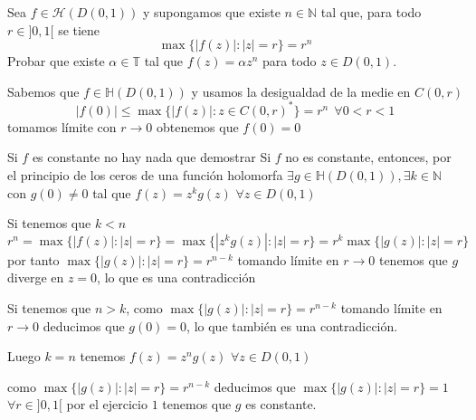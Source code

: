 \begin{ejer}
	Sea $f\in\mathcal{H}(D(0,1))$ y supongamos que existe $n\in\mathbb{N}$ tal que, para todo $r\in ]0,1[$ se tiene
	$$ \max \{ |f(z)| : |z|=r \} = r^n $$
	Probar que existe $\alpha\in\mathbb{T}$ tal que $f(z)=\alpha z^n$ para todo $z\in D(0,1)$.
\end{ejer}
\begin{sol}
Sabemos que $f\in\mathbb{H}(D(0,1))$ y usamos la desigualdad de la medie en $C(0,r)$ 
$$|f(0)| \leq \max\{ |f(z)| : z\in C(0,r)^{\ast} \} = r^n\ \ \forall 0<r<1$$
tomamos límite con $r\rightarrow 0$ obtenemos que $f(0)=0$

Si $f$ es constante no hay nada que demostrar
Si $f$ no es constante, entonces, por el principio de los ceros de una función holomorfa $\exists g\in\mathbb{H}(D(0,1)), \exists k\in\mathbb{N}$ con $g(0) \not=0$ tal que $f(z) = z^kg(z)$ $\forall z\in D(0,1)$

Si tenemos que $k<n$
$$r^n = \max\{ |f(z)| : |z|=r \} = \max\{ |z^kg(z)| : |z|=r \} = r^k \max\{ |g(z)| : |z|=r \}$$
por tanto
$\max\{ |g(z)| : |z|=r \} = r^{n-k}$ tomando límite en $r\rightarrow0$ tenemos que $g$ diverge en $z=0$, lo que es una contradicción

Si tenemos que $n>k$,
como $\max\{ |g(z)| : |z|=r \} = r^{n-k}$ tomando límite en $r\rightarrow 0$ deducimos que $g(0)=0$, lo que también es una contradicción.

Luego $k=n$ tenemos $f(z)=z^ng(z)$ $\forall z\in D(0,1)$

como $\max\{ |g(z)| : |z|=r \} = r^{n-k}$ deducimos que $\max\{ |g(z)| : |z|=r \} = 1$ $\forall r\in]0,1[$
por el ejercicio $1$ tenemos que $g$ es constante.



\begin{comment}
	ENUNCIADO
	Si $f\in\mathbb{H}(\mathbb{C})$ y es inyectiva, ¿Qué se puede decir de $f$?
	
	SOLUCIÓN
	Como $f$ es entera tenemos que $f(z) = \sum_{n=0}^{\infty} \frac{f^{(n)}(0)}{n!}z^n \forall z\in\mathbb{C}$
	
	Si $f$ es un polinomio de grado $k$
	si $k\geq 2$ el teorema fundamental del álgebra nos dice que $f$ tiene al menos $2$ ceros (contando multiplicidad), los ceros no pueden ser distintos porque $f$ es inyectiva, por tanto $f$ tiene un cero de orden al menos $2$.
	
	$f$ no es inyectiva en un entorno de un punto donde se anule la derivada, por tanto tenemos una contradicción ya que $f$ es inyectiva.
	
	Si $f$ es entera no polinómica, como consecuencia del teorema de Casorati $f(\mathbb{C}\backslash\overline{D}(0,R))$ es denso en $\mathbb{C}$
	
	Por el teorema de la aplicación abierta sabemos que $f(D(0,r))$
	Entonces hay dos puntos donde la función vale lo mismo, por tanto no puede ser inyectiva.
	
\end{comment}
\end{sol}
